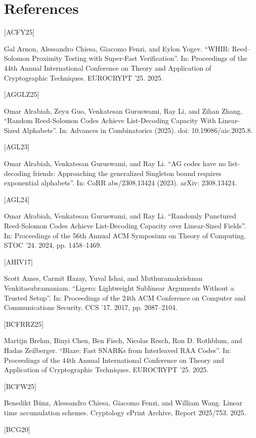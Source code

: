 \documentclass[11pt]{article}
\begin{document}
\section*{References}

[ACFY25]

Gal Arnon, Alessandro Chiesa, Giacomo Fenzi, and Eylon Yogev. “WHIR: Reed–Solomon
Proximity Testing with Super-Fast Verification”. In: Proceedings of the 44th Annual International Conference on Theory and Application of Cryptographic Techniques. EUROCRYPT ’25. 2025.

[AGGLZ25]

Omar Alrabiah, Zeyu Guo, Venkatesan Guruswami, Ray Li, and Zihan Zhang. “Random
Reed-Solomon Codes Achieve List-Decoding Capacity With Linear-Sized Alphabets”. In:
Advances in Combinatorics (2025). doi: 10.19086/aic.2025.8.

[AGL23]

Omar Alrabiah, Venkatesan Guruswami, and Ray Li. “AG codes have no list-decoding
friends: Approaching the generalized Singleton bound requires exponential alphabets”. In:
CoRR abs/2308.13424 (2023). arXiv: 2308.13424.

[AGL24]

Omar Alrabiah, Venkatesan Guruswami, and Ray Li. “Randomly Punctured Reed-Solomon
Codes Achieve List-Decoding Capacity over Linear-Sized Fields”. In: Proceedings of the 56th
Annual ACM Symposium on Theory of Computing. STOC ’24. 2024, pp. 1458–1469.

[AHIV17]

Scott Ames, Carmit Hazay, Yuval Ishai, and Muthuramakrishnan Venkitasubramaniam.
“Ligero: Lightweight Sublinear Arguments Without a Trusted Setup”. In: Proceedings of
the 24th ACM Conference on Computer and Communications Security. CCS ’17. 2017,
pp. 2087–2104.

[BCFRRZ25]

Martijn Brehm, Binyi Chen, Ben Fisch, Nicolas Resch, Ron D. Rothblum, and Hadas Zeilberger. “Blaze: Fast SNARKs from Interleaved RAA Codes”. In: Proceedings of the 44th
Annual International Conference on Theory and Application of Cryptographic Techniques.
EUROCRYPT ’25. 2025.

[BCFW25]

Benedikt Bünz, Alessandro Chiesa, Giacomo Fenzi, and William Wang. Linear time accumulation schemes. Cryptology ePrint Archive, Report 2025/753. 2025.

[BCG20]
\end{document}
